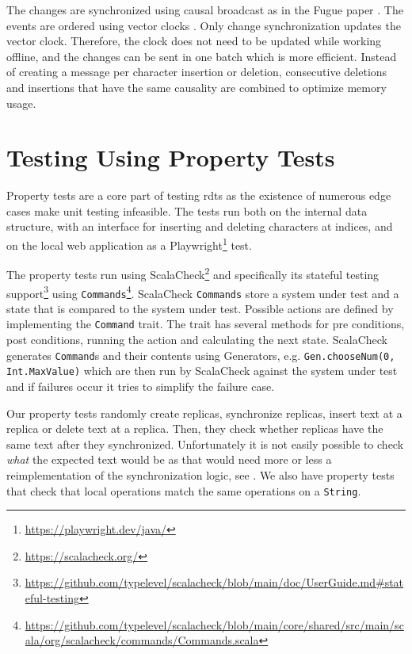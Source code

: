 The changes are synchronized using causal broadcast as in the Fugue paper \cite{2023-weidner-minimizing-interleaving}. The events are ordered using vector clocks \cite{1988-mattern-vector-clock,1988-fidge-vector-clock}. Only change synchronization updates the vector clock. Therefore, the clock does not need to be updated while working offline, and the changes can be sent in one batch which is more efficient. Instead of creating a message per character insertion or deletion, consecutive deletions and insertions that have the same causality are combined to optimize memory usage.

\section{Testing Using Property Tests}\label{sec:property-tests}

Property tests are a core part of testing \glspl{rdt} as the existence of numerous edge cases make unit testing infeasible. The tests run both on the internal data structure, with an interface for inserting and deleting characters at indices, and on the local web application as a Playwright\footnote{\url{https://playwright.dev/java/}} test.

The property tests run using ScalaCheck\footnote{\url{https://scalacheck.org/}} and specifically its stateful testing support\footnote{\url{https://github.com/typelevel/scalacheck/blob/main/doc/UserGuide.md\#stateful-testing}} using \texttt{Commands}\footnote{\label{footnote:commands}\url{https://github.com/typelevel/scalacheck/blob/main/core/shared/src/main/scala/org/scalacheck/commands/Commands.scala}}. ScalaCheck \texttt{Commands} store a system under test and a state that is compared to the system under test. Possible actions are defined by implementing the \texttt{Command} trait. The trait has several methods for pre conditions, post conditions, running the action and calculating the next state. ScalaCheck generates \texttt{Command}s and their contents using Generators, e.g. \texttt{Gen.chooseNum(0, Int.MaxValue)} which are then run by ScalaCheck against the system under test and if failures occur it tries to simplify the failure case.

Our property tests randomly create replicas, synchronize replicas, insert text at a replica or delete text at a replica. Then, they check whether replicas have the same text after they synchronized. Unfortunately it is not easily possible to check \textit{what} the expected text would be as that would need more or less a reimplementation of the synchronization logic, see . We also have property tests that check that local operations match the same operations on a \texttt{String}.

